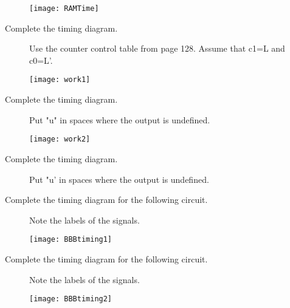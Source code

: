 \begin{description}
            \texttt{[image: RAMTime]}

            \pagebreak

        \item[Complete the timing diagram.]  Use the counter control table
            from page 128.  Assume that c1=L and c0=L'.

            \texttt{[image: work1]}

        \item[Complete the timing diagram.]  Put "u" in spaces where the output
            is undefined.

            \texttt{[image: work2]}

        \item[Complete the timing diagram.]  Put "u' in spaces where the output
            is undefined.


            \pagebreak
        \item[Complete the timing diagram for the following circuit.]
            Note the labels of the signals.

            \texttt{[image: BBBtiming1]}

        \item[Complete the timing diagram for the following circuit.]
            Note the labels of the signals.

            \texttt{[image: BBBtiming2]}

    \end{description}
